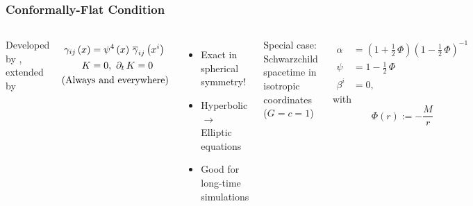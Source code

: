 \documentclass{beamer}
\begin{document}
\begin{frame}
\frametitle{Conformally-Flat Condition}

  \begin{columns}[c]


      Developed by \citet{wmm1996}, extended by \citet{ccd2009}

      \begin{align*}
        \gamma_{ij}\left(x\right)
        &=\psi^{4}\left(x\right)\,\overline{\gamma}_{ij}\left(x^{i}\right) \\
        K&=0,\ \p_{t}\,K=0 \\
        &\hspace{-3em}\mathrm{(Always\ and\ everywhere)}
      \end{align*}\vspace{1em}

      \begin{itemize}
        \item Exact in spherical symmetry!
        \item Hyperbolic $\rightarrow$ Elliptic equations
        \item Good for long-time simulations
      \end{itemize}


      Special case: Schwarzchild spacetime in isotropic coordinates
      ($G=c=1$)

      \begin{align*}
        \alpha
          &=\left(1+\frac{1}{2}\,\Phi\right)
            \left(1-\frac{1}{2}\,\Phi\right)^{-1} \\
        \psi
          &=1-\frac{1}{2}\,\Phi \\
        \beta^{i}
          &=0,
      \end{align*}
      with
      \begin{equation*}
        \Phi\left(r\right):=-\frac{M}{r}
      \end{equation*}

  \end{columns}

\end{frame}
\end{document}
